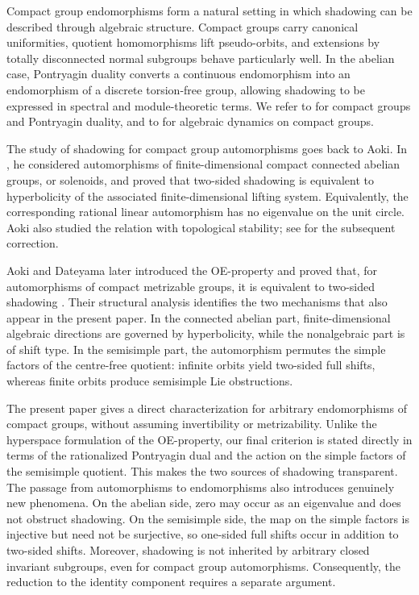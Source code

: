 \documentclass[12pt]{amsart}
\theoremstyle{definition}
\numberwithin{equation}{section}
\theoremstyle{remark}
\begin{document}
Compact group endomorphisms form a natural setting in which shadowing can be
described through algebraic structure. Compact groups carry canonical
uniformities, quotient homomorphisms lift pseudo-orbits, and extensions by
totally disconnected normal subgroups behave particularly well. In the
abelian case, Pontryagin duality converts a continuous endomorphism into an
endomorphism of a discrete torsion-free group, allowing shadowing to be
expressed in spectral and module-theoretic terms. We refer to \cite{HM,Morris}
for compact groups and Pontryagin duality, and to
\cite{KitchensSchmidt,Schmidt} for algebraic dynamics on compact groups.

The study of shadowing for compact group automorphisms goes back to Aoki. In
\cite{AokiSolenoid}, he considered automorphisms of finite-dimensional compact
connected abelian groups, or solenoids, and proved that two-sided shadowing is
equivalent to hyperbolicity of the associated finite-dimensional lifting
system. Equivalently, the corresponding rational linear automorphism has no
eigenvalue on the unit circle. Aoki also studied the relation with
topological stability; see \cite{AokiCorrection} for the subsequent
correction.

Aoki and Dateyama later introduced the OE-property and proved that, for
automorphisms of compact metrizable groups, it is equivalent to two-sided
shadowing \cite{AD}. Their structural analysis identifies the two mechanisms
that also appear in the present paper. In the connected abelian part,
finite-dimensional algebraic directions are governed by hyperbolicity, while
the nonalgebraic part is of shift type. In the semisimple part, the
automorphism permutes the simple factors of the centre-free quotient:
infinite orbits yield two-sided full shifts, whereas finite orbits produce
semisimple Lie obstructions.

The present paper gives a direct characterization for arbitrary
endomorphisms of compact groups, without assuming invertibility or
metrizability. Unlike the hyperspace formulation of the OE-property, our final
criterion is stated directly in terms of the rationalized Pontryagin dual and
the action on the simple factors of the semisimple quotient. This makes the
two sources of shadowing transparent. The passage from automorphisms to
endomorphisms also introduces genuinely new phenomena. On the abelian side,
zero may occur as an eigenvalue and does not obstruct shadowing. On the
semisimple side, the map on the simple factors is injective but need not be
surjective, so one-sided full shifts occur in addition to two-sided shifts.
Moreover, shadowing is not inherited by arbitrary closed invariant subgroups,
even for compact group automorphisms. Consequently, the reduction to the
identity component requires a separate argument.
\end{document}
